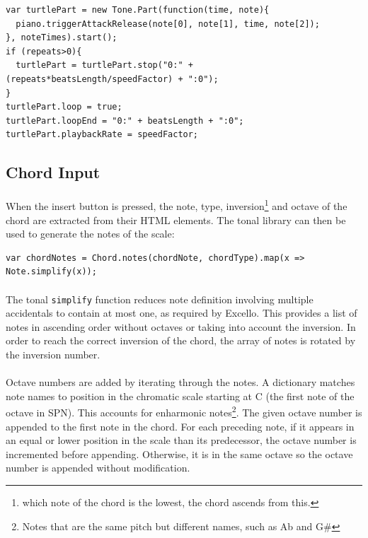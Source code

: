 \begin{verbatim}
var turtlePart = new Tone.Part(function(time, note){
  piano.triggerAttackRelease(note[0], note[1], time, note[2]);
}, noteTimes).start();
if (repeats>0){
  turtlePart = turtlePart.stop("0:" + (repeats*beatsLength/speedFactor) + ":0");
}
turtlePart.loop = true;
turtlePart.loopEnd = "0:" + beatsLength + ":0";
turtlePart.playbackRate = speedFactor;
\end{verbatim}

\subsection{Chord Input}

\paragraph{} When the insert button is pressed, the note, type, inversion\footnote{which note of the chord is the lowest, the chord ascends from this.} and octave of the chord are extracted from their HTML elements. The tonal library can then be used to generate the notes of the scale:

\begin{verbatim}
var chordNotes = Chord.notes(chordNote, chordType).map(x => Note.simplify(x));
\end{verbatim}

\paragraph{} The tonal \texttt{simplify} function reduces note definition involving multiple accidentals to contain at most one, as required by Excello. This provides a list of notes in ascending order without octaves or taking into account the inversion. In order to reach the correct inversion of the chord, the array of notes is rotated by the inversion number.

\paragraph{} Octave numbers are added by iterating through the notes. A dictionary matches note names to position in the chromatic scale starting at C (the first note of the octave in SPN). This accounts for enharmonic notes\footnote{Notes that are the same pitch but different names, such as Ab and G\#}. The given octave number is appended to the first note in the chord. For each preceding note, if it appears in an equal or lower position in the scale than its predecessor, the octave number is incremented before appending. Otherwise, it is in the same octave so the octave number is appended without modification.

